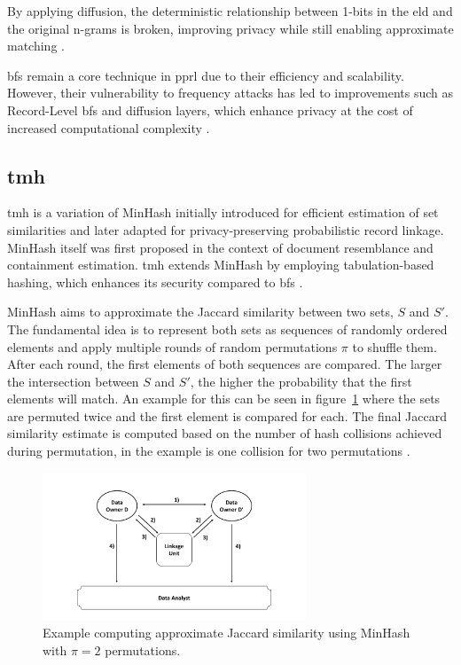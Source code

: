By applying diffusion, the deterministic relationship between 1-bits in the \ac{eld} and the original n-grams is broken, improving privacy while still enabling approximate matching \cite{armknecht2023strengthening}.

\ac{bf}s remain a core technique in \ac{pprl} due to their efficiency and scalability.
However, their vulnerability to frequency attacks has led to improvements such as Record-Level \ac{bf}s and diffusion layers, which enhance privacy at the cost of increased computational complexity \cite{schaefer2024, vidanage2020graph,armknecht2023strengthening}.


\subsection{\ac{tmh}} \label{sec:tmh}

\ac{tmh} is a variation of MinHash initially introduced for efficient estimation of set similarities and later adapted for privacy-preserving probabilistic record linkage.
MinHash itself was first proposed in the context of document resemblance and containment estimation.
\ac{tmh} extends MinHash by employing tabulation-based hashing, which enhances its security compared to \ac{bf}s \cite{vidanage2020graph,broder1997resemblance}.

MinHash aims to approximate the Jaccard similarity between two sets, \(S\) and \(S'\).
The fundamental idea is to represent both sets as sequences of randomly ordered elements and apply multiple rounds of random permutations \(\pi\) to shuffle them.
After each round, the first elements of both sequences are compared.
The larger the intersection between \(S\) and \(S'\), the higher the probability that the first elements will match.
An example for this can be seen in figure~\ref{fig:minhashexample} where the sets are permuted twice and the first element is compared for each.
The final Jaccard similarity estimate is computed based on the number of hash collisions achieved during permutation, in the example is one collision for two permutations \cite{schaefer2024,broder1997resemblance,vidanage2020graph}.

\begin{figure}[H]
  \centering
  \includegraphics[width=0.7\textwidth, page=6]{img/visualization.pdf}
  \caption{Example computing approximate Jaccard similarity using MinHash with \(\pi = 2\) permutations.}
  \label{fig:minhashexample}
\end{figure}

